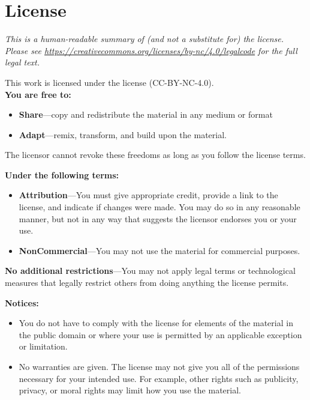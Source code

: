 \chapter{License}\label{s:license}

{\setlength{\parindent}{0em}

\emph{
  This is a human-readable summary of (and not a substitute for) the license.
  Please see \url{https://creativecommons.org/licenses/by-nc/4.0/legalcode} for the full legal text.
}

\vspace{\baselineskip}

\noindent
This work is licensed under the
 license
(CC-BY-NC-4.0).\\

\noindent
\textbf{You are free to:}

\begin{itemize}
\item
  \textbf{Share}---copy and redistribute the material in any medium or
  format
\item
  \textbf{Adapt}---remix, transform, and build upon the material.
\end{itemize}

The licensor cannot revoke these freedoms as long as you follow the
license terms.

\vspace{\baselineskip}

\textbf{Under the following terms:}

\begin{itemize}
\item
  \textbf{Attribution}---You must give appropriate credit, provide a link
  to the license, and indicate if changes were made. You may do so in
  any reasonable manner, but not in any way that suggests the licensor
  endorses you or your use. \\
\item
  \textbf{NonCommercial}---You may not use the material for commercial purposes.
\end{itemize}

\textbf{No additional restrictions}---You may not apply legal terms or
technological measures that legally restrict others from doing anything the
license permits.

\vspace{\baselineskip}

\textbf{Notices:}

\begin{itemize}

\item
  You do not have to comply with the license for elements of the
  material in the public domain or where your use is permitted by an
  applicable exception or limitation.

\item
  No warranties are given. The license may not give you all of the
  permissions necessary for your intended use. For example, other rights
  such as publicity, privacy, or moral rights may limit how you use the
  material.

\end{itemize}
}
